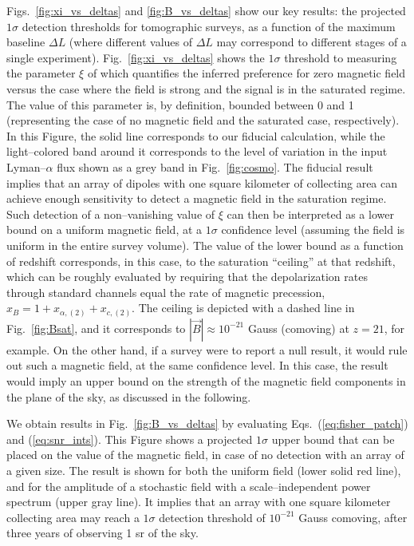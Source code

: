 Figs.~\ref{fig:xi_vs_deltas} and \ref{fig:B_vs_deltas} show our key results: the projected $1\sigma$ detection thresholds for tomographic surveys, as a function of the maximum baseline $\Delta L$ (where different values of $\Delta L$ may correspond to different stages of a single experiment). Fig.~\ref{fig:xi_vs_deltas} shows the $1\sigma$ threshold to measuring the parameter $\xi$ of \eq{\ref{eq:saturated_P}} which quantifies the inferred preference for zero magnetic field versus the case where the field is strong and the signal is in the saturated regime. The value of this parameter is, by definition, bounded between 0 and 1 (representing the case of no magnetic field and the saturated case, respectively). In this Figure, the solid line corresponds to our fiducial calculation, while the light--colored band around it corresponds to the level of variation in the input Lyman--$\alpha$ flux shown as a grey band in Fig.~\ref{fig:cosmo}. The fiducial result implies that an array of dipoles with one square kilometer of collecting area can achieve enough sensitivity to detect a magnetic field in the saturation regime. Such detection of a non--vanishing value of $\xi$ can then be interpreted as a lower bound on a uniform magnetic field, at a $1\sigma$ confidence level (assuming the field is uniform in the entire survey volume). The value of the lower bound as a function of redshift  corresponds, in this case, to the saturation ``ceiling'' at that redshift, which can be roughly evaluated by requiring that the depolarization rates through standard channels equal the rate of magnetic precession, $x_B = 1+x_{\alpha ,(2)} +x_{c,(2)}$. The ceiling is depicted with a dashed line in Fig.~\ref{fig:Bsat}, and it corresponds to $|\vec B|\approx10^{-21}$ Gauss (comoving) at $z=21$, for example.  On the other hand, if a survey were to report a null result, it would rule out such a magnetic field, at the same confidence level. In this case, the result would imply an upper bound on the strength of the magnetic field components in the plane of the sky, as discussed in the following. 

We obtain results in Fig.~\ref{fig:B_vs_deltas} by evaluating Eqs.~(\ref{eq:fisher_patch}) and (\ref{eq:snr_ints}). This Figure shows a projected $1\sigma$ upper bound that can be placed on the value of the magnetic field, in case of no detection with an array of a given size. The result is shown for both the uniform field (lower solid red line), and for the amplitude of a stochastic field with a scale--independent power spectrum (upper gray line). It implies that an array with one square kilometer collecting area may reach a $1\sigma$ detection threshold of $10^{-21}$ Gauss comoving, after three years of observing 1 sr of the sky. 

